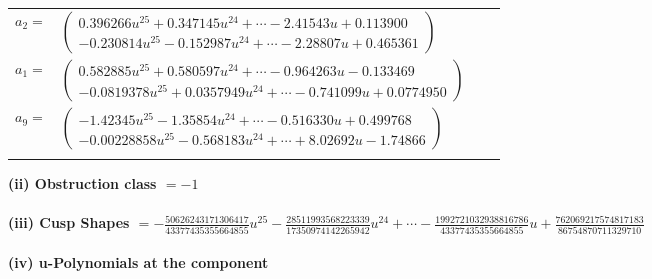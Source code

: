 \documentclass[1p]{elsarticle_modified}
\theoremstyle{definition}
\begin{document}
\begin{tabular}{m{7pt} m{180pt} m{7pt} m{180pt} }
\flushright $a_{2}=$&$\begin{pmatrix}0.396266 u^{25}+0.347145 u^{24}+\cdots-2.41543 u+0.113900\\-0.230814 u^{25}-0.152987 u^{24}+\cdots-2.28807 u+0.465361\end{pmatrix}$ \\
\flushright $a_{1}=$&$\begin{pmatrix}0.582885 u^{25}+0.580597 u^{24}+\cdots-0.964263 u-0.133469\\-0.0819378 u^{25}+0.0357949 u^{24}+\cdots-0.741099 u+0.0774950\end{pmatrix}$ \\
\flushright $a_{9}=$&$\begin{pmatrix}-1.42345 u^{25}-1.35854 u^{24}+\cdots-0.516330 u+0.499768\\-0.00228858 u^{25}-0.568183 u^{24}+\cdots+8.02692 u-1.74866\end{pmatrix}$\\&\end{tabular}
\flushleft \textbf{(ii) Obstruction class $= -1$}\\~\\
\flushleft \textbf{(iii) Cusp Shapes $= -\frac{50626243171306417}{43377435355664855} u^{25}-\frac{28511993568223339}{17350974142265942} u^{24}+\cdots-\frac{1992721032938816786}{43377435355664855} u+\frac{762069217574817183}{86754870711329710}$}\\~\\
\newpage\renewcommand{\arraystretch}{1}
\flushleft \textbf{(iv) u-Polynomials at the component}\newline \\
\end{document}
